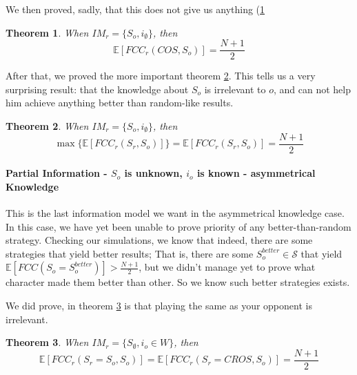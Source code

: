 \documentclass[a4paper,english,10pt]{article}
\newtheorem{theorem}{Theorem}[section]
\newcommand\rob{\ensuremath{r}\xspace}
\newcommand\opp{\ensuremath{o}\xspace}
\newcommand{\w}{\ensuremath{W}\xspace}
\newcommand{\fcc}{\ensuremath{FCC}\xspace}
\newcommand{\cros}{\ensuremath{CROS}\xspace}
\newcommand{\coos}{\ensuremath{COS}\xspace}
\begin{document}
We then proved, sadly, that this does not give us anything (\ref{theorems: coos stupid}
\begin{theorem} \label{theorems: coos stupid}
When $IM_\rob=\lbrace S_\opp , i_\emptyset \rbrace$, then \[\mathbb{E}[\fcc_\rob(\coos, S_\opp)]=\frac{N+1}{2}\]
\end{theorem}

After that, we proved the more important theorem \ref{theorems: 2d max fcc unknown io}. This tells us a very surprising result: that the knowledge about $S_\opp$ is irrelevant to \opp, and can not help him achieve anything better than random-like results.

\begin{theorem}\label{theorems: 2d max fcc unknown io}
When $IM_\rob=\lbrace S_\opp , i_\emptyset \rbrace$, then \[\max \lbrace \mathbb{E}[\fcc_\rob(S_\rob, S_\opp)]\rbrace=\mathbb{E}[\fcc_\rob(S_\rob, S_\opp)]=\frac{N+1}{2}\]
\end{theorem}


\paragraph{Partial Information - $S_\opp$ is unknown, $i_\opp$ is known - asymmetrical Knowledge} 
This is the last information model we want in the asymmetrical knowledge case. In this case, we have yet been unable to prove priority of any better-than-random strategy.
Checking our simulations, we know that indeed, there are some strategies that yield better results; That is, there are some $S^{better}_{\opp}\in \mathcal{S}$ that yield $\mathbb{E}[\fcc(S_\opp=S^{better}_{\opp})] > \frac{N+1}{2}$, but we didn't manage yet to prove what character made them better than other. So we know such better strategies exists.

We did prove, in theorem \ref{theorems: 2d known io unknown so} is that playing the same as your opponent is irrelevant.
\begin{theorem} \label{theorems: 2d known io unknown so}
When $IM_\rob = \lbrace S_\emptyset, i_o \in \w \rbrace$, then \[\mathbb{E}[\fcc_\rob(S_\rob=S_\opp, S_\opp)] = \mathbb{E}[\fcc_\rob(S_\rob=\cros, S_\opp)] = \frac{N+1}{2}\]
\end{theorem}


\end{document}
